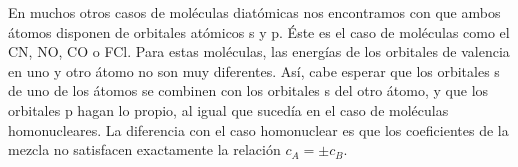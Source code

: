 \documentclass{tufte-handout}
\begin{document}
En muchos otros casos de moléculas diatómicas nos
encontramos con que ambos átomos disponen de orbitales
atómicos s y p. Éste es el caso de moléculas como el 
CN, NO, CO o FCl. Para estas moléculas, las energías 
de los orbitales de valencia en uno y otro átomo no son muy diferentes. Así, cabe esperar que los orbitales s de uno de
los átomos se combinen con los orbitales s del otro átomo, 
y que los orbitales p hagan lo propio, al igual que sucedía
en el caso de moléculas homonucleares. La diferencia con 
el caso homonuclear es que los coeficientes de la mezcla 
no satisfacen exactamente la relación $c_A = \pm c_B$.

%
%
%

\end{document}
